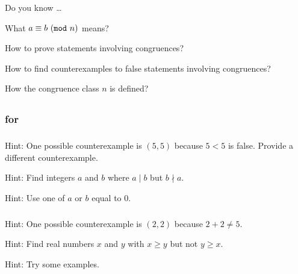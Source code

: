 \begin{exer}[\exerR] %
\label{exer_dyk_cong_modn}
    Do you know \ldots
        \begin{exerpart}
            \item What $a \equiv b ~(\texttt{mod}~n)$ means?
            \item How to prove statements involving congruences?
            \item How to find counterexamples to false statements involving congruences?
            \item How the congruence class  $n$ is defined?
        \end{exerpart}
\end{exer}

\subsection{\answers}

\subsubsection{\answers for 
\subrelppty}

\subsubsection*{ \answers}
\begin{apart}
    \item Hint: One possible counterexample is $(5,5)$ because $5<5$ is false.  Provide a different counterexample.
    \item Hint: Find integers $a$ and $b$ where $a \mid b$ but $b \nmid a$.
    \item Hint: Use one of $a$ or $b$ equal to 0. 
\end{apart}

\subsubsection*{ \answers}
\begin{apart}
    \item Hint: One possible counterexample is $(2,2)$ because $2+2 \neq 5$.
    \item Hint: Find real numbers $x$ and $y$ with $x \ge y$ but not $y \ge x$.
    \item Hint: Try some examples.
\end{apart}

